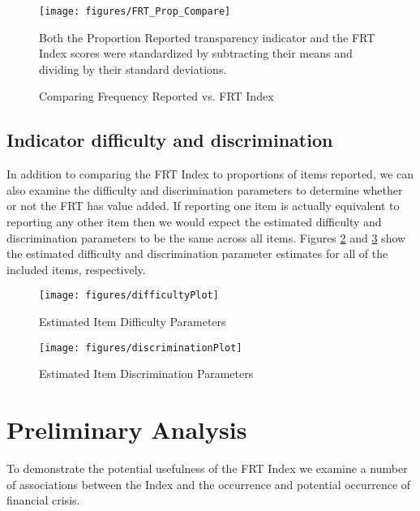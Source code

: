 \documentclass[a4paper]{article}
\begin{document}
\begin{figure}
    \caption{Comparing Frequency Reported vs. FRT Index}
    \label{CompFreqFRT}
    \begin{center}
        \texttt{[image: figures/FRT\_Prop\_Compare]}
    \end{center}
    {\scriptsize{Both the Proportion Reported transparency indicator and the FRT Index scores were standardized by subtracting their means and dividing by their standard deviations.}}
\end{figure}


\subsection{Indicator difficulty and discrimination}

In addition to comparing the FRT Index to proportions of items reported, we can also examine the difficulty and discrimination parameters to determine whether or not the FRT has value added. If reporting one item is actually equivalent to reporting any other item then we would expect the estimated difficulty and discrimination parameters to be the same across all items. Figures \ref{DifficultyFig} and \ref{DiscrimFig} show the estimated difficulty and discrimination parameter estimates for all of the included items, respectively.


\begin{figure}
    \caption{Estimated Item Difficulty Parameters}
    \label{DifficultyFig}
    \begin{center}
        \texttt{[image: figures/difficultyPlot]}
    \end{center}
\end{figure}



\begin{figure}
    \caption{Estimated Item Discrimination Parameters}
    \label{DiscrimFig}
    \begin{center}
        \texttt{[image: figures/discriminationPlot]}
    \end{center}
\end{figure}


\section{Preliminary Analysis}

To demonstrate the potential usefulness of the FRT Index we examine a number of associations between the Index and the occurrence and potential occurrence of financial crisis.
\end{document}
